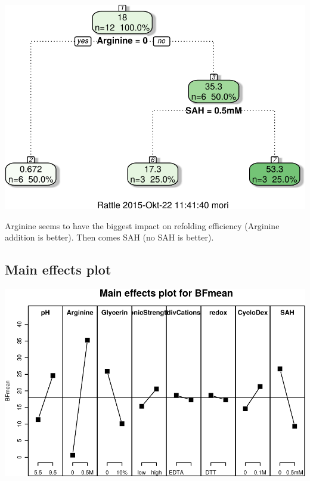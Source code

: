 \documentclass[]{article}
\begin{document}
\includegraphics{analysis_files/figure-latex/unnamed-chunk-3-1.pdf}

Arginine seems to have the biggest impact on refolding efficiency
(Arginine addition is better). Then comes SAH (no SAH is better).

\subsection{Main effects plot}\label{main-effects-plot}

\includegraphics{analysis_files/figure-latex/unnamed-chunk-4-1.pdf}
\end{document}

